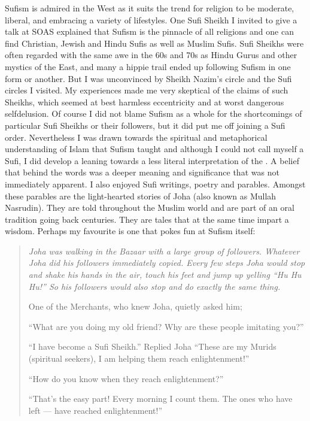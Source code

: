 \documentclass[12pt]{memoir}
\begin{document}
Sufism is admired in the West as it suits the trend for religion
to be moderate, liberal, and embracing a variety of lifestyles.
One Sufi Sheikh I invited to give a talk at SOAS explained
that Sufism is the pinnacle of all religions and one can find
Christian, Jewish and Hindu Sufis as well as Muslim Sufis.
Sufi Sheikhs were often regarded with the same awe in the 60s and 70s
as Hindu Gurus and other mystics of the East,
and many a hippie trail ended up following Sufism in one form or another.
But I was unconvinced by Sheikh Nazim’s circle
and the Sufi circles I  visited.
My experiences made me very skeptical of the claims of such Sheikhs,
which seemed at best harmless eccentricity
and at worst dangerous self\–delusion.
Of course I did not blame Sufism as a whole for the short\cor{-}{}comings
of particular Sufi Sheikhs or their followers,
but it did put me off joining a Sufi order.
Nevertheless I was drawn towards the spiritual and metaphorical understanding
of Islam that Sufism taught and although I could not call myself a Sufi,
I did develop a leaning towards a less literal interpretation of the \Quran.
A belief that behind the words was a deeper meaning and significance
that was not immediately apparent.
I also enjoyed Sufi writings, poetry and parables.
Amongst these parables are the light-hearted stories of Joha
(also known as Mullah Nasrudin).
They are told throughout the Muslim world
and are part of an oral tradition going back centuries.
They are  tales that at the same time impart a wisdom.
Perhaps my favourite is one that pokes fun at Sufism itself:

\begin{quote}
\itshape
Joha was walking in the Bazaar with a large group of followers.
Whatever Joha did his followers immediately copied.
Every few steps Joha would stop and shake his hands in the air,
touch his feet and jump up yelling “Hu Hu Hu!”
So his followers would also stop and do exactly the same thing.

One of the Merchants, who knew Joha, quietly asked him;

“What are you doing my old friend?
Why are these people imitating you?”

“I have become a Sufi Sheikh.”
Replied Joha “These are my Murids (spiritual seekers),
I am helping them reach enlightenment!”

“How do you know when they reach enlightenment?”

“That’s the easy part! Every morning I count them.
The ones who have left — have reached enlightenment!”
\end{quote}
\end{document}
